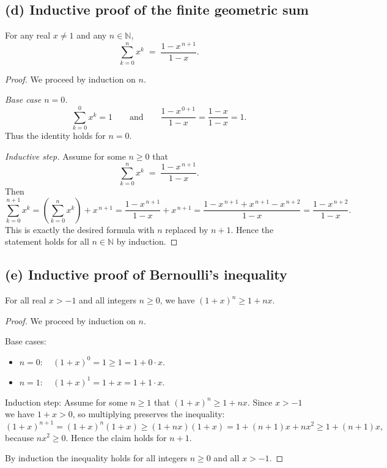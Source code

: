 \documentclass[12pt,a4paper]{article}
\theoremstyle{definition}
\theoremstyle{remark}
\begin{document}
\subsection*{(d) Inductive proof of the finite geometric sum}
For any real $x\neq 1$ and any $n\in\mathbb{N}$,
\[
\sum_{k=0}^{n} x^k \;=\; \frac{1 - x^{\,n+1}}{1 - x}.
\]

\begin{proof}
We proceed by induction on $n$.

\emph{Base case $n=0$.}
\[
\sum_{k=0}^{0} x^k = 1
\qquad\text{and}\qquad
\frac{1 - x^{\,0+1}}{1 - x} = \frac{1 - x}{1 - x} = 1.
\]
Thus the identity holds for $n=0$.

\emph{Inductive step.}
Assume for some $n\ge 0$ that
\[
\sum_{k=0}^{n} x^k \;=\; \frac{1 - x^{\,n+1}}{1 - x}.
\]
Then
\[
\sum_{k=0}^{n+1} x^k
= \left(\sum_{k=0}^{n} x^k\right) + x^{\,n+1}
= \frac{1 - x^{\,n+1}}{1 - x} + x^{\,n+1}
= \frac{1 - x^{\,n+1} + x^{\,n+1} - x^{\,n+2}}{1 - x}
= \frac{1 - x^{\,n+2}}{1 - x}.
\]
This is exactly the desired formula with $n$ replaced by $n+1$. Hence the statement holds for all $n\in\mathbb{N}$ by induction.

\end{proof}

\subsection*{(e) Inductive proof of Bernoulli's inequality}
For all real $x>-1$ and all integers $n\ge0$, we have $(1+x)^n \ge 1 + nx$.

\begin{proof}
We proceed by induction on \(n\).

Base cases:
\begin{itemize}
\item \(n=0:\quad (1+x)^0=1 \ge 1 = 1+0\cdot x.\)
\item \(n=1:\quad (1+x)^1=1+x = 1+1\cdot x.\)
\end{itemize}

Induction step: Assume for some \(n\ge1\) that \((1+x)^n \ge 1 + nx\). Since \(x>-1\) we have \(1+x>0\), so multiplying preserves the inequality:
\[
(1+x)^{n+1}=(1+x)^n(1+x)\ge(1+nx)(1+x)=1+(n+1)x+nx^2\ge1+(n+1)x,
\]
because \(nx^2\ge0\). Hence the claim holds for \(n+1\).

By induction the inequality holds for all integers \(n\ge0\) and all \(x>-1\).
\end{proof}
\end{document}
